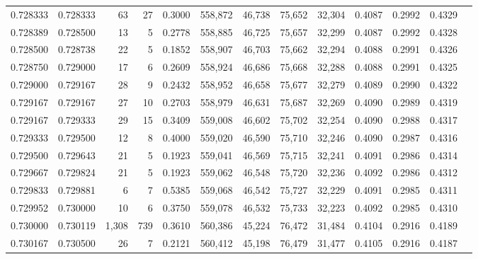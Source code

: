 \begin{tabular}{rrrrrrrrrrrrr}
0.728333 & 0.728333 &    63 &  27 &                                     0.3000 & 558,872 &  46,738 &  75,652 &  32,304 & 0.4087 & 0.2992 & 0.4329 \\
0.728389 & 0.728500 &    13 &   5 &                                     0.2778 & 558,885 &  46,725 &  75,657 &  32,299 & 0.4087 & 0.2992 & 0.4328 \\
0.728500 & 0.728738 &    22 &   5 &                                     0.1852 & 558,907 &  46,703 &  75,662 &  32,294 & 0.4088 & 0.2991 & 0.4326 \\
0.728750 & 0.729000 &    17 &   6 &                                     0.2609 & 558,924 &  46,686 &  75,668 &  32,288 & 0.4088 & 0.2991 & 0.4325 \\
0.729000 & 0.729167 &    28 &   9 &                                     0.2432 & 558,952 &  46,658 &  75,677 &  32,279 & 0.4089 & 0.2990 & 0.4322 \\
0.729167 & 0.729167 &    27 &  10 &                                     0.2703 & 558,979 &  46,631 &  75,687 &  32,269 & 0.4090 & 0.2989 & 0.4319 \\
0.729167 & 0.729333 &    29 &  15 &                                     0.3409 & 559,008 &  46,602 &  75,702 &  32,254 & 0.4090 & 0.2988 & 0.4317 \\
0.729333 & 0.729500 &    12 &   8 &                                     0.4000 & 559,020 &  46,590 &  75,710 &  32,246 & 0.4090 & 0.2987 & 0.4316 \\
0.729500 & 0.729643 &    21 &   5 &                                     0.1923 & 559,041 &  46,569 &  75,715 &  32,241 & 0.4091 & 0.2986 & 0.4314 \\
0.729667 & 0.729824 &    21 &   5 &                                     0.1923 & 559,062 &  46,548 &  75,720 &  32,236 & 0.4092 & 0.2986 & 0.4312 \\
0.729833 & 0.729881 &     6 &   7 &                                     0.5385 & 559,068 &  46,542 &  75,727 &  32,229 & 0.4091 & 0.2985 & 0.4311 \\
0.729952 & 0.730000 &    10 &   6 &                                     0.3750 & 559,078 &  46,532 &  75,733 &  32,223 & 0.4092 & 0.2985 & 0.4310 \\
0.730000 & 0.730119 & 1,308 & 739 &                                     0.3610 & 560,386 &  45,224 &  76,472 &  31,484 & 0.4104 & 0.2916 & 0.4189 \\
0.730167 & 0.730500 &    26 &   7 &                                     0.2121 & 560,412 &  45,198 &  76,479 &  31,477 & 0.4105 & 0.2916 & 0.4187 \\

\end{tabular}
